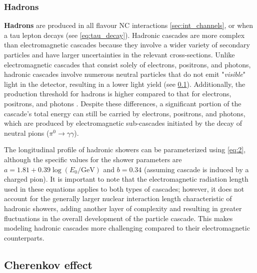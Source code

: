 \subsubsection{Hadrons}
\label{sec:hadrons_inice}
\textbf{Hadrons} are produced in all flavour NC interactions \ref{sec:int_channels}, or when a tau lepton decays (see \ref{eq:tau_decay}). Hadronic cascades are more complex than electromagnetic cascades because they involve a wider variety of secondary particles and have larger uncertainties in the relevant cross-sections. Unlike electromagnetic cascades that consist solely of electrons, positrons, and photons, hadronic cascades involve numerous neutral particles that do not emit "\emph{visible}" light in the detector, resulting in a lower light yield (see \ref{sec:cherenkov}). Additionally, the production threshold for hadrons is higher compared to that for electrons, positrons, and photons . Despite these differences, a significant portion of the cascade’s total energy can still be carried by electrons, positrons, and photons, which are produced by electromagnetic sub-cascades initiated by the decay of neutral pions ($\pi^0 \rightarrow \gamma\gamma$). 

The longitudinal profile of hadronic showers can be parameterized using \ref{eq:2}, although the specific values for the shower parameters are $a = 1.81 + 0.39 \log(E_0/\text{GeV})$ and $b = 0.34$ (assuming cascade is induced by a charged pion). It is important to note that the electromagnetic radiation length used in these equations applies to both types of cascades; however, it does not account for the generally larger nuclear interaction length characteristic of hadronic showers, adding another layer of complexity and resulting in greater fluctuations in the overall development of the particle cascade. This makes modeling hadronic cascades more challenging compared to their electromagnetic counterparts.

\subsection{Cherenkov effect}
\label{sec:cherenkov}

